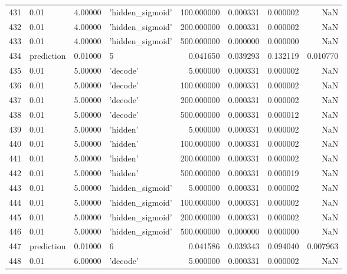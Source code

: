 \documentclass[10pt,a4paper]{article}
\begin{document}
\begin{tabular}{llrlrrrr}
431  &        0.01 &   4.00000 &   'hidden\_sigmoid' &  100.000000 &  0.000331 &  0.000002 &       NaN \\
432  &        0.01 &   4.00000 &   'hidden\_sigmoid' &  200.000000 &  0.000331 &  0.000002 &       NaN \\
433  &        0.01 &   4.00000 &   'hidden\_sigmoid' &  500.000000 &  0.000000 &  0.000000 &       NaN \\
434  &  prediction &   0.01000 &                  5 &    0.041650 &  0.039293 &  0.132119 &  0.010770 \\
435  &        0.01 &   5.00000 &           'decode' &    5.000000 &  0.000331 &  0.000002 &       NaN \\
436  &        0.01 &   5.00000 &           'decode' &  100.000000 &  0.000331 &  0.000002 &       NaN \\
437  &        0.01 &   5.00000 &           'decode' &  200.000000 &  0.000331 &  0.000002 &       NaN \\
438  &        0.01 &   5.00000 &           'decode' &  500.000000 &  0.000331 &  0.000012 &       NaN \\
439  &        0.01 &   5.00000 &           'hidden' &    5.000000 &  0.000331 &  0.000002 &       NaN \\
440  &        0.01 &   5.00000 &           'hidden' &  100.000000 &  0.000331 &  0.000002 &       NaN \\
441  &        0.01 &   5.00000 &           'hidden' &  200.000000 &  0.000331 &  0.000002 &       NaN \\
442  &        0.01 &   5.00000 &           'hidden' &  500.000000 &  0.000331 &  0.000019 &       NaN \\
443  &        0.01 &   5.00000 &   'hidden\_sigmoid' &    5.000000 &  0.000331 &  0.000002 &       NaN \\
444  &        0.01 &   5.00000 &   'hidden\_sigmoid' &  100.000000 &  0.000331 &  0.000002 &       NaN \\
445  &        0.01 &   5.00000 &   'hidden\_sigmoid' &  200.000000 &  0.000331 &  0.000002 &       NaN \\
446  &        0.01 &   5.00000 &   'hidden\_sigmoid' &  500.000000 &  0.000000 &  0.000000 &       NaN \\
447  &  prediction &   0.01000 &                  6 &    0.041586 &  0.039343 &  0.094040 &  0.007963 \\
448  &        0.01 &   6.00000 &           'decode' &    5.000000 &  0.000331 &  0.000002 &       NaN \\

\end{tabular}
\end{document}
